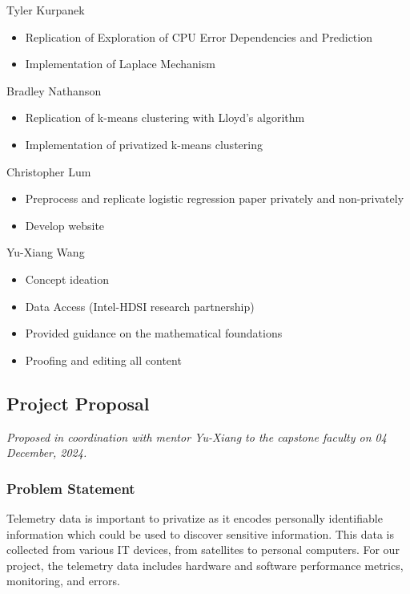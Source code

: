 \documentclass[12pt,letterpaper]{article}
\begin{document}
Tyler Kurpanek
\begin{itemize}
    \item Replication of Exploration of CPU Error Dependencies and Prediction \cite{Kwasnick2023}
    \item Implementation of Laplace Mechanism 
\end{itemize}

Bradley Nathanson
\begin{itemize}
    \item Replication of k-means clustering with Lloyd's algorithm \cite{kmeans}
    \item Implementation of privatized k-means clustering
\end{itemize}

Christopher Lum
\begin{itemize}
  \item Preprocess and replicate logistic regression paper privately and non-privately \cite{prodhealLR}
  \item Develop website
\end{itemize}

Yu-Xiang Wang
\begin{itemize}
  \item Concept ideation
  \item Data Access (Intel-HDSI research partnership)
  \item Provided guidance on the mathematical foundations
  \item Proofing and editing all content
\end{itemize}


\subsection{Project Proposal}

\textit{Proposed in coordination with mentor Yu-Xiang to the capstone faculty on 04 December, 2024.}

% 

\subsubsection{Problem Statement}

Telemetry data is important to privatize as it encodes personally identifiable information which could be used to discover sensitive information. This data is collected from various IT devices, from satellites to personal computers. For our project, the telemetry data includes hardware and software performance metrics, monitoring, and errors. 
\end{document}
